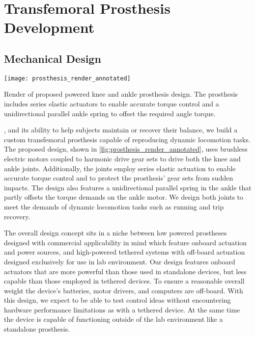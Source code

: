 \chapter{Transfemoral Prosthesis Development}\label{sec:pros_design}

\section{Mechanical Design}\label{sec:pros_mech_design}
\begin{marginfigure}[1.25in]
    \centering
    \texttt{[image: prosthesis\_render\_annotated]}
    \caption{Render of proposed powered knee and ankle prosthesis design. The
    prosthesis includes series elastic actuators to enable accurate torque
    control and a unidirectional parallel ankle spring to offset the required
    angle torque.}\label{fig:prosthesis_render_annotated}
\end{marginfigure} 

, and its
ability to help subjects maintain or recover their balance, we build a custom
transfemoral prosthesis capable of reproducing dynamic locomotion tasks. The
proposed design, shown in \cref{fig:prosthesis_render_annotated}, uses brushless
electric motors coupled to harmonic drive gear sets to drive both the knee and
ankle joints.  Additionally, the joints employ series elastic actuation to
enable accurate torque control and to protect the prosthesis' gear sets from
sudden impacts.  The design also features a unidirectional parallel spring in
the ankle that partly offsets the torque demands on the ankle motor.  We design
both joints to meet the demands of dynamic locomotion tasks such as running and
trip recovery.

The overall design concept sits in a niche between low powered prostheses
designed with commercial applicability in mind
\citep{sup2007design,sup2009preliminary,lawson2014robotic,rouse2015design,
martinez2011antagonistic} which feature onboard actuation and power sources, and
high-powered tethered systems \citep{caputo2013experimental,
caputo2015informing} with off-board actuation designed exclusively for use in
lab environment. Our design features onboard actuators that are more powerful
than those used in standalone devices, but less capable than those employed in
tethered devices. To ensure a reasonable overall weight the device's batteries,
motor drivers, and computers are off-board. With this design, we expect to be
able to test control ideas without encountering hardware performance limitations
as with a tethered device. At the same time the device is capable of functioning
outside of the lab environment like a standalone prosthesis. 

